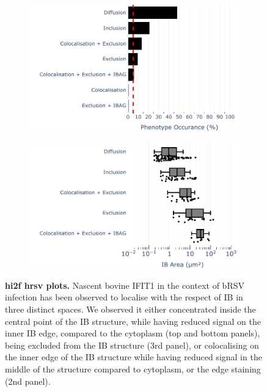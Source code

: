 \begin{figure}
    \begin{subfigure}{0.5\textwidth}
        \caption{}
        \includegraphics[width=1\linewidth]{10. Chapter 5/Figs/03. IFIT2-FLAG/03. IFIT2F/02. Infection Transfection/01. bar_hi2f_hrsv.pdf} 
    \end{subfigure}
    \begin{subfigure}{0.5\textwidth}
        \caption{}
        \includegraphics[width=1\linewidth]{10. Chapter 5/Figs/03. IFIT2-FLAG/03. IFIT2F/02. Infection Transfection/02. box_hi2f_hrsv.pdf}
    \end{subfigure}
    \caption[hi2f hrsv plots]{\textbf{hi2f hrsv plots.} Nascent bovine IFIT1 in the context of bRSV infection has been observed to localise with the respect of IB in three distinct spaces. We observed it either concentrated inside the central point of the IB structure, while having reduced signal on the inner IB edge, compared to the cytoplasm (top and bottom panels), being excluded from the IB structure (3rd panel), or colocalising on the inner edge of the IB structure while having reduced signal in the middle of the structure compared to cytoplasm, or the edge staining (2nd panel).}
    \label{fig:hi2f hrsv plots}
\end{figure}

